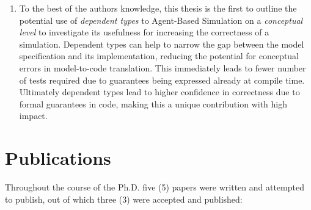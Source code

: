 \begin{enumerate}
	\item To the best of the authors knowledge, this thesis is the first to outline the potential use of \textit{dependent types} to Agent-Based Simulation on a \textit{conceptual level} to investigate its usefulness for increasing the correctness of a simulation. Dependent types can help to narrow the gap between the model specification and its implementation, reducing the potential for conceptual errors in model-to-code translation. This immediately leads to fewer number of tests required due to guarantees being expressed already at compile time. Ultimately dependent types lead to higher confidence in correctness due to formal guarantees in code, making this a unique contribution with high impact.
\end{enumerate}

\section{Publications}
Throughout the course of the Ph.D. five (5) papers were written and attempted to publish, out of which three (3) were accepted and published:


